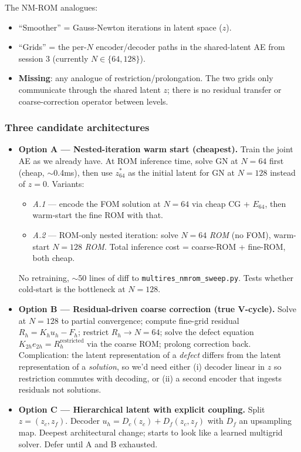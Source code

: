 The NM-ROM analogues:
\begin{itemize}
  \item ``Smoother'' = Gauss-Newton iterations in latent space ($z$).
  \item ``Grids'' = the per-$N$ encoder/decoder paths in the shared-latent AE
        from session 3 (currently $N \in \{64, 128\}$).
  \item \textbf{Missing}: any analogue of restriction/prolongation. The two
        grids only communicate through the shared latent $z$; there is no
        residual transfer or coarse-correction operator between levels.
\end{itemize}

\subsubsection*{Three candidate architectures}
\begin{itemize}
  \item \textbf{Option A --- Nested-iteration warm start (cheapest).}
        Train the joint AE as we already have. At ROM inference time, solve
        GN at $N=64$ first (cheap, $\sim$0.4ms), then use $z_{64}^\ast$ as
        the initial latent for GN at $N=128$ instead of $z=0$. Variants:
        \begin{itemize}
          \item \emph{A.1} --- encode the FOM solution at $N=64$ via cheap CG
                + $E_{64}$, then warm-start the fine ROM with that.
          \item \emph{A.2} --- ROM-only nested iteration: solve $N=64$
                \emph{ROM} (no FOM), warm-start $N=128$ \emph{ROM}. Total
                inference cost = coarse-ROM + fine-ROM, both cheap.
        \end{itemize}
        No retraining, $\sim$50 lines of diff to
        \texttt{multires\_nmrom\_sweep.py}. Tests whether cold-start is the
        bottleneck at $N=128$.
  \item \textbf{Option B --- Residual-driven coarse correction (true V-cycle).}
        Solve at $N=128$ to partial convergence; compute fine-grid residual
        $R_h = K_h u_h - F_h$; restrict $R_h \to N=64$; solve the defect
        equation $K_{2h} e_{2h} = R_h^{\text{restricted}}$ via the coarse
        ROM; prolong correction back. Complication: the latent representation
        of a \emph{defect} differs from the latent representation of a
        \emph{solution}, so we'd need either (i) decoder linear in $z$ so
        restriction commutes with decoding, or (ii) a second encoder that
        ingests residuals not solutions.
  \item \textbf{Option C --- Hierarchical latent with explicit coupling.}
        Split $z = (z_c, z_f)$. Decoder $u_h = D_c(z_c) + D_f(z_c, z_f)$
        with $D_f$ an upsampling map. Deepest architectural change; starts
        to look like a learned multigrid solver. Defer until A and B exhausted.
\end{itemize}

